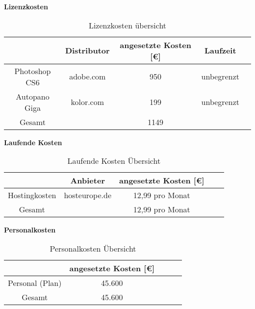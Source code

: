 \textbf{Lizenzkosten}

\begin{table}[h]
\centering
\begin{tabular}{ccccl}
\hline
\multicolumn{1}{l}{}      & Distributor & angesetzte Kosten {[}€{]} & Laufzeit    \\ \hline
Photoshop CS6             & adobe.com             & 950       & unbegrenzt        \\ \hline
Autopano Giga             & kolor.com             & 199       & unbegrenzt        \\ \hline

Gesamt                    &                       & 1149      &                   \\ \hline
\end{tabular}
\caption{Lizenzkosten übersicht}%
\label{tab:KostenaufstellungLizenzen}%
\end{table}


\clearpage
\textbf{Laufende Kosten}

\begin{table}[h]
\centering
\begin{tabular}{ccccl}
\hline
\multicolumn{1}{l}{}     & Anbieter       & angesetzte Kosten {[}€{]} \\ \hline
Hostingkosten            & hosteurope.de  & 12,99 pro Monat           \\ \hline

Gesamt                   &                & 12,99 pro Monat            \\ \hline
\end{tabular}
\caption{Laufende Kosten Übersicht}%
\label{tab:KostenaufstellungLaufendeKosten}%
\end{table}



\textbf{Personalkosten}

\begin{table}[h]
\centering
\begin{tabular}{ccccl}
\hline
\multicolumn{1}{l}{}      & angesetzte Kosten {[}€{]}   \\ \hline
Personal (Plan)           & 45.600\footnotemark[10]     \\ \hline

Gesamt                    & 45.600                      \\ \hline
\end{tabular}
\caption{Personalkosten Übersicht}%
\label{tab:KostenaufstellungPersonal}%
\end{table}

